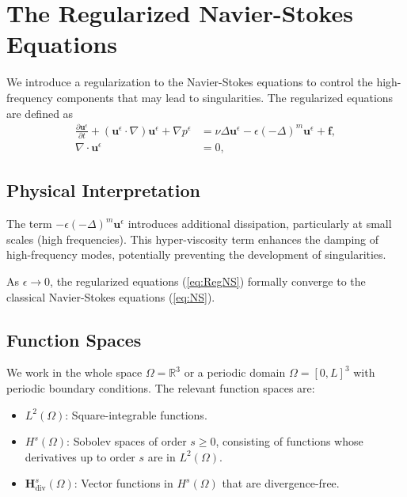 \documentclass[11pt]{article}
\begin{document}
\section{The Regularized Navier-Stokes Equations}

We introduce a regularization to the Navier-Stokes equations to control the high-frequency components that may lead to singularities. The regularized equations are defined as
\begin{equation}
\begin{aligned}
\frac{\partial \mathbf{u}^\epsilon}{\partial t} + (\mathbf{u}^\epsilon \cdot \nabla)\mathbf{u}^\epsilon + \nabla p^\epsilon &= \nu \Delta \mathbf{u}^\epsilon - \epsilon (-\Delta)^m \mathbf{u}^\epsilon + \mathbf{f}, \\
\nabla \cdot \mathbf{u}^\epsilon &= 0,
\end{aligned}
\label{eq:RegNS}
\end{equation}  %

\subsection{Physical Interpretation}

The term $- \epsilon (-\Delta)^m \mathbf{u}^\epsilon$ introduces additional dissipation, particularly at small scales (high frequencies). This hyper-viscosity term enhances the damping of high-frequency modes, potentially preventing the development of singularities.

As $\epsilon \to 0$, the regularized equations (\ref{eq:RegNS}) formally converge to the classical Navier-Stokes equations (\ref{eq:NS}).

\subsection{Function Spaces}

We work in the whole space $\Omega = \mathbb{R}^3$ or a periodic domain $\Omega = [0, L]^3$ with periodic boundary conditions. The relevant function spaces are:

\begin{itemize}[itemsep=0pt]
    \item $L^2(\Omega)$: Square-integrable functions.
    \item $H^s(\Omega)$: Sobolev spaces of order $s \geq 0$, consisting of functions whose derivatives up to order $s$ are in $L^2(\Omega)$.
    \item $\mathbf{H}^s_{\text{div}}(\Omega)$: Vector functions in $H^s(\Omega)$ that are divergence-free.
\end{itemize}
\end{document}
